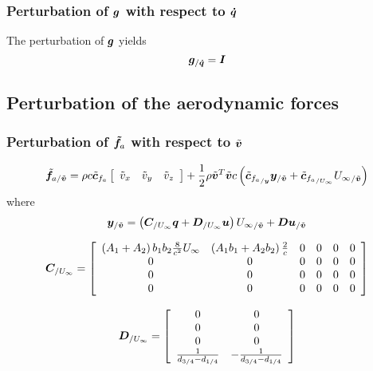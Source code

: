 \subsubsection{Perturbation of $\bm{g}$ with respect to $\bm{\dot{q}}$}
The perturbation of $\bm{g}$ yields
\begin{equation}
\bm{g}_{/{\bm{\dot{q}}}} = \bm{I}
\end{equation}

\subsection{Perturbation of the aerodynamic forces}

\subsubsection{Perturbation of $\bm{\tilde{f}}_a$ with respect to $\tilde{\bm{v}}$}


\begin{equation}
\tilde{\bm{f}}_{a/\tilde{\bm{v}}} = 
	\rho c \tilde{\bm{c}}_{f_{a}} \left[
		\begin{array}{ccc}
			\tilde{v}_x & \tilde{v}_y & \tilde{v}_z
		\end{array} \right] +
	\frac{1}{2} \rho \tilde{\bm{v}}^T \tilde{\bm{v}} c
	\left(  \tilde{\bm{c}}_{{f_{a}}_{/\bm{y}}} \bm{y}_{/\tilde{\bm{v}}} + 
	\tilde{\bm{c}}_{{f_{a}}_{/U_{\infty}}} {U_\infty}_{/\tilde{\bm{v}}}  \right) 
\end{equation}
where
\begin{equation}
\bm{y}_{/\tilde{\bm{v}}} = \left( 
	\bm{C}_{/U_{\infty}} \bm{q} + \bm{D}_{/U_{\infty}} \bm{u} \right) {U_\infty}_{/\tilde{\bm{v}}}
	+ \bm{D} \bm{u}_{/\tilde{\bm{v}}}
\end{equation}


\begin{equation}
\bm{C}_{/U_\infty} = \left[
	\begin{array}{cccccc}
	\left(  A_1 + A_2 \right) b_1 b_2 \frac{8}{c^2} U_\infty & \left(  A_1 b_1 + A_2 b_2 \right) \frac{2}{c} & 0 & 0 & 0 & 0\\
	0 & 0 & 0 & 0 & 0 & 0\\
	0 & 0 & 0 & 0 & 0 & 0\\
	0 & 0 & 0 & 0 & 0 & 0\\
	\end{array}
	\right]
\end{equation}

\begin{equation}
\bm{D}_{/U_\infty} = \left[
	\begin{array}{cc}
	0 & 0 \\
	0 & 0 \\
	0 & 0 \\
	\frac{1}{d_{3/4} - d_{1/4}} & 	-\frac{1}{d_{3/4} - d_{1/4}} \\
	\end{array}
	\right]
\end{equation}


